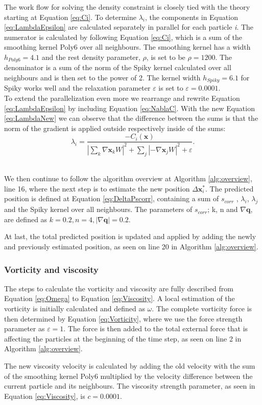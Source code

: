 The work flow for solving the density constraint is closely tied with the theory starting at Equation \ref{eq:Ci}.
To determine $\lambda_{i}$, the components in Equation \ref{eq:LambdaEpsilon} are calculated separately in parallel
for each particle \textit{i}.
The numerator is calculated by following Equation \ref{eq:Ci}, which is a sum of the smoothing kernel Poly6 over
all neighbours. The smoothing kernel has a width $h_{Poly6} = 4.1$ and the rest density parameter, $\rho$, is set to be $\rho = 1200$.
The denominator is a sum of the norm of the Spiky kernel calculated over all neighbours
and is then set to the power of 2. The kernel width $h_{Spiky} = 6.1$ for Spiky works well and the
relaxation parameter $\varepsilon$ is set to $\varepsilon = 0.0001$.
\\
\newline
To extend the parallelization even more we rearrange and rewrite Equation \ref{eq:LambdaEpsilon} by including Equation \ref{eq:NablaC}. With the
new Equation \ref{eq:LambdaNew} we can observe that the difference between the sums is that the norm of the gradient is applied
outside respectively inside of the sums:
\\
\begin{equation}
\label{eq:LambdaNew}
\lambda_i = \frac{- C_i(\mathbf{x}) }{ |\sum\limits_{k} \nabla \mathbf{x}_k W|^{2} + \sum\limits_{j} |-\nabla \mathbf{x}_j W|^2  + \varepsilon}.
\end{equation}
\\
\newline

We then continue to follow the algorithm overview at Algorithm \ref{alg:overview}, line 16, where the next step is to estimate the new position $\Delta \mathbf{x}^{*}_{i}$.
The predicted position is defined at Equation \ref{eq:DeltaPscorr}, containing a sum of $s_{corr}$ , $\lambda_{i}$, $\lambda_{j}$
and the Spiky kernel over all neighbours.
The parameters of $s_{corr}$; k, n and $ \nabla \mathbf{q}$, are defined as $k = 0.2, n = 4, |\nabla \mathbf{q}| = 0.2$.

At last, the total predicted position is updated and applied by adding the newly and previously estimated position,
as seen on line 20 in Algorithm \ref{alg:overview}.

\subsubsection{Vorticity and viscosity}
The steps to calculate the vorticity and viscosity are fully described from Equation \ref{eq:Omega} to Equation \ref{eq:Viscosity}.
A local estimation of the vorticity is initially calculated and defined as $\omega$. The complete vorticity force is then determined
by Equation \ref{eq:Vorticity}, where we use the force strength parameter as $\varepsilon = 1$. The force is then added to the total
external force that is affecting the particles at the beginning of the time step, as seen on line 2 in Algorithm \ref{alg:overview}.

The new viscosity velocity is calculated by adding the old velocity with the sum of the smoothing kernel Poly6 multiplied by the velocity difference between
the current particle and its neighbours. The viscosity strength parameter, as seen in Equation \ref{eq:Viscosity}, is $c = 0.0001$.
